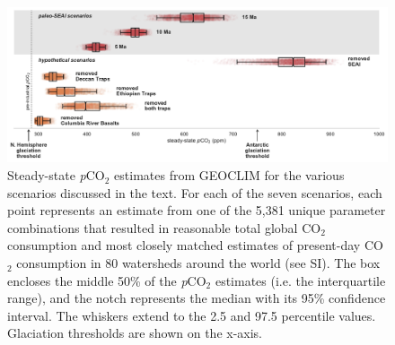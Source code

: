 \documentclass[11pt,letterpaper]{article}
\newcommand{\pCOtwo}{\textit{p}CO$_{2}$\xspace}
\newcommand{\COtwo}{CO$_{2}$\xspace}
\begin{document}
\begin{figure}[h!]
    \centering
    \includegraphics[width=1\textwidth]{Figures/scenario_pCO2.pdf}
    \caption{Steady-state \pCOtwo estimates from GEOCLIM for the various scenarios discussed in the text. For each of the seven scenarios, each point represents an estimate from one of the 5,381 unique parameter combinations that resulted in reasonable total global \COtwo consumption and most closely matched estimates of present-day \COtwo consumption in 80 watersheds around the world (see SI). The box encloses the middle 50\% of the \pCOtwo estimates (i.e. the interquartile range), and the notch represents the median with its 95\% confidence interval. The whiskers extend to the 2.5 and 97.5 percentile values. Glaciation thresholds \cite{DeConto2008a} are shown on the x-axis.}
    \label{fig:scenario_pCO2}
\end{figure}

\clearpage
\newpage
\footnotesize

\singlespacing



\end{document}

